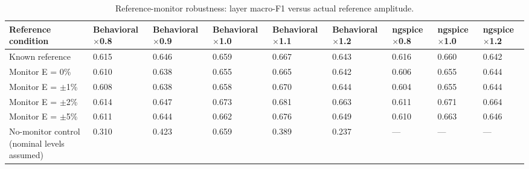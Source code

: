 \begin{table}[H]
\caption{Reference-monitor robustness: layer macro-F1 versus actual reference amplitude.\label{tab:table07_reference_monitor}}
\centering
\footnotesize
\begin{tabular}{p{3.2cm}p{1.4cm}p{1.4cm}p{1.4cm}p{1.4cm}p{1.4cm}p{1.4cm}p{1.4cm}p{1.4cm}}
\toprule
\textbf{Reference condition} & \textbf{Behavioral $\times$0.8} & \textbf{Behavioral $\times$0.9} & \textbf{Behavioral $\times$1.0} & \textbf{Behavioral $\times$1.1} & \textbf{Behavioral $\times$1.2} & \textbf{ngspice $\times$0.8} & \textbf{ngspice $\times$1.0} & \textbf{ngspice $\times$1.2} \\
\midrule
Known reference & 0.615 & 0.646 & 0.659 & 0.667 & 0.643 & 0.616 & 0.660 & 0.642 \\
Monitor E = 0\% & 0.610 & 0.638 & 0.655 & 0.665 & 0.642 & 0.606 & 0.655 & 0.644 \\
Monitor E = $\pm$1\% & 0.608 & 0.638 & 0.658 & 0.670 & 0.644 & 0.604 & 0.655 & 0.644 \\
Monitor E = $\pm$2\% & 0.614 & 0.647 & 0.673 & 0.681 & 0.663 & 0.611 & 0.671 & 0.664 \\
Monitor E = $\pm$5\% & 0.611 & 0.644 & 0.662 & 0.676 & 0.649 & 0.610 & 0.663 & 0.646 \\
No-monitor control (nominal levels assumed) & 0.310 & 0.423 & 0.659 & 0.389 & 0.237 & --- & --- & --- \\
\bottomrule
\end{tabular}
\par\vspace{2pt}
\end{table}

